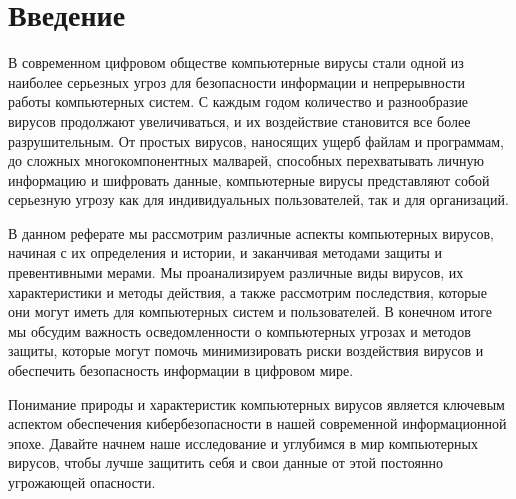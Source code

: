 \section{Введение}

В современном цифровом обществе компьютерные вирусы стали одной из наиболее серьезных угроз для безопасности информации и непрерывности работы компьютерных систем. С каждым годом количество и разнообразие вирусов продолжают увеличиваться, и их воздействие становится все более разрушительным. От простых вирусов, наносящих ущерб файлам и программам, до сложных многокомпонентных малварей, способных перехватывать личную информацию и шифровать данные, компьютерные вирусы представляют собой серьезную угрозу как для индивидуальных пользователей, так и для организаций.

В данном реферате мы рассмотрим различные аспекты компьютерных вирусов, начиная с их определения и истории, и заканчивая методами защиты и превентивными мерами. Мы проанализируем различные виды вирусов, их характеристики и методы действия, а также рассмотрим последствия, которые они могут иметь для компьютерных систем и пользователей. В конечном итоге мы обсудим важность осведомленности о компьютерных угрозах и методов защиты, которые могут помочь минимизировать риски воздействия вирусов и обеспечить безопасность информации в цифровом мире.

Понимание природы и характеристик компьютерных вирусов является ключевым аспектом обеспечения кибербезопасности в нашей современной информационной эпохе. Давайте начнем наше исследование и углубимся в мир компьютерных вирусов, чтобы лучше защитить себя и свои данные от этой постоянно угрожающей опасности.



